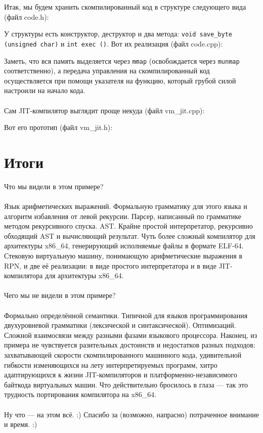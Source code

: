 \documentclass[11pt]{book}
\begin{document}
\bigskip
Итак, мы будем хранить скомпилированный код в структуре следующего вида (файл code.h):

У структуры есть конструктор, деструктор и два метода: \texttt{void save\_byte (unsigned char)} и \texttt{int exec ()}.
Вот их реализация (файл code.cpp):

Заметь, что вся память выделяется через \texttt{mmap} (освобождается через \texttt{munmap} соответственно),
а передача управления на скомпилированный код осуществляется при помощи указателя на функцию,
который грубой силой настроили на начало кода.
\\ \\
Сам JIT-компилятор выглядит проще некуда (файл vm\_jit.cpp):

Вот его прототип (файл vm\_jit.h):


\section{Итоги}
Что мы видели в этом примере?
\\ \\
Язык арифметических выражений.
Формальную грамматику для этого языка и алгоритм избавления от левой рекурсии.
Парсер, написанный по грамматике методом рекурсивного спуска.
AST.
Крайне простой интерпретатор, рекурсивно обходящий AST и вычисляющий результат.
Чуть более сложный компилятор для архитектуры x86\_64, генерирующий исполняемые файлы в формате ELF-64.
Стековую виртуальную машину, понимающую арифметические выражения в RPN,
и две её реализации: в виде простого интерпретатора и в виде JIT-компилятора для архитектуры x86\_64.
\\ \\
Чего мы не видели в этом примере?
\\ \\
Формально определённой семантики.
Типичной для языков программирования двухуровневой грамматики (лексической и синтаксической).
Оптимизаций.
Сложной взаимосвязи между разными фазами языкового процессора.
Наконец, из примера не чувствуется разительных достоинств и недостатков разных подходов:
захватывающей скорости скомпилированного машинного кода,
удивительной гибкости изменяющихся на лету интерпретируемых программ,
хитро адаптирующихся к жизни JIT-компиляторов
и платформенно-независимого байткода виртуальных машин.
Что действительно бросилось в глаза --- так это трудность портирования компилятора на x86\_64.
\\ \\
Ну что --- на этом всё. :)
Спасибо за (возможно, напрасно) потраченное внимание и время. :)
\end{document}
